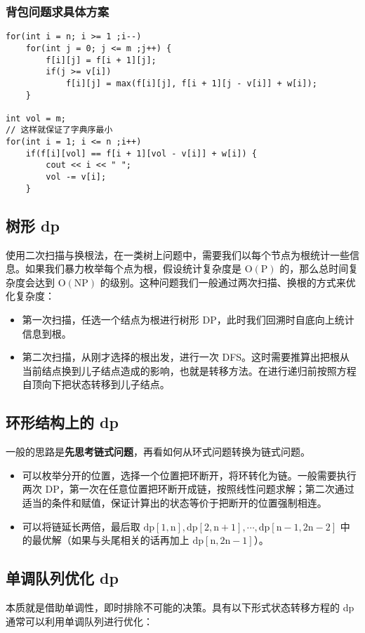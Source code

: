 \documentclass[UTF8]{article}
\begin{document}
\subsubsection{背包问题求具体方案}
\begin{lstlisting}[caption=背包问题求具体方案]
for(int i = n; i >= 1 ;i--)
	for(int j = 0; j <= m ;j++) {
		f[i][j] = f[i + 1][j];
		if(j >= v[i])
			f[i][j] = max(f[i][j], f[i + 1][j - v[i]] + w[i]);
	}

int vol = m;
// 这样就保证了字典序最小
for(int i = 1; i <= n ;i++) 
	if(f[i][vol] == f[i + 1][vol - v[i]] + w[i]) {
		cout << i << " ";
		vol -= v[i];
	}
\end{lstlisting}


\subsection{树形 dp}
使用二次扫描与换根法，在一类树上问题中，需要我们以每个节点为根统计一些信息。如果我们暴力枚举每个点为根，假设统计复杂度是 $\mathrm{O(P)}$ 的，那么总时间复杂度会达到 $\mathrm{O(NP)}$ 的级别。这种问题我们一般通过两次扫描、换根的方式来优化复杂度：

\begin{itemize}
	\item 第一次扫描，任选一个结点为根进行树形 DP，此时我们回溯时自底向上统计信息到根。
	\item 第二次扫描，从刚才选择的根出发，进行一次 DFS。这时需要推算出把根从当前结点换到儿子结点造成的影响，也就是转移方法。在进行递归前按照方程自顶向下把状态转移到儿子结点。
\end{itemize}


\subsection{环形结构上的 dp}
一般的思路是\textbf{先思考链式问题}，再看如何从环式问题转换为链式问题。

\begin{itemize}
	\item 可以枚举分开的位置，选择一个位置把环断开，将环转化为链。一般需要执行两次 DP，第一次在任意位置把环断开成链，按照线性问题求解；第二次通过适当的条件和赋值，保证计算出的状态等价于把断开的位置强制相连。
	\item 可以将链延长两倍，最后取 $\mathrm{dp[1,n], dp[2 ,n + 1], \cdots, dp[n - 1, 2n - 2]}$ 中的最优解（如果与头尾相关的话再加上 $\mathrm{dp[n, 2n - 1]}$）。
\end{itemize}


\subsection{单调队列优化 dp}
本质就是借助单调性，即时排除不可能的决策。具有以下形式状态转移方程的 dp 通常可以利用单调队列进行优化：
\end{document}
